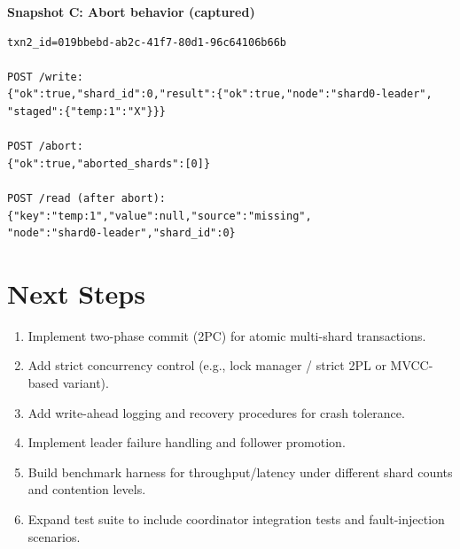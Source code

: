 \documentclass[11pt]{article}
\begin{document}
\textbf{Snapshot C: Abort behavior (captured)}
\begin{Verbatim}[fontsize=\small,frame=single]
txn2_id=019bbebd-ab2c-41f7-80d1-96c64106b66b

POST /write:
{"ok":true,"shard_id":0,"result":{"ok":true,"node":"shard0-leader",
"staged":{"temp:1":"X"}}}

POST /abort:
{"ok":true,"aborted_shards":[0]}

POST /read (after abort):
{"key":"temp:1","value":null,"source":"missing",
"node":"shard0-leader","shard_id":0}
\end{Verbatim}

\section{Next Steps}
\begin{enumerate}[leftmargin=1.4em]
    \item Implement two-phase commit (2PC) for atomic multi-shard transactions.
    \item Add strict concurrency control (e.g., lock manager / strict 2PL or MVCC-based variant).
    \item Add write-ahead logging and recovery procedures for crash tolerance.
    \item Implement leader failure handling and follower promotion.
    \item Build benchmark harness for throughput/latency under different shard counts and contention levels.
    \item Expand test suite to include coordinator integration tests and fault-injection scenarios.
\end{enumerate}
\end{document}
